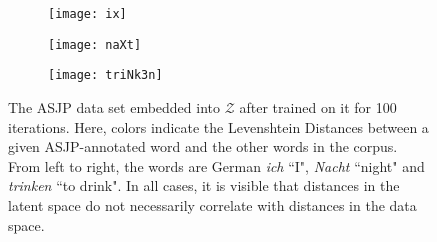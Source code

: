 \documentclass[6pt]{article}
\begin{document}
 \begin{figure}[h!] 
  \begin{subfigure}[b]{0.3\linewidth}
    \centering
    \texttt{[image: ix]} 
    \label{fig:vae_phono_distances0} 
  \end{subfigure}%
  \begin{subfigure}[b]{0.3\linewidth}
    \centering
    \texttt{[image: naXt]} 
    \label{fig:vae_phono_distances1} 
  \end{subfigure} 
  \begin{subfigure}[b]{0.3\linewidth}
    \centering
    \texttt{[image: triNk3n]} 
    \label{fig:vae_phono_distances2} 
  \end{subfigure}%
   \caption{The ASJP data set embedded into $\mathcal{Z}$ after trained on it for 100 iterations. Here, colors indicate the Levenshtein Distances between a given ASJP-annotated word and the other words in the corpus. From left to right, the words are German \textit{ich} ``I", \textit{Nacht} ``night" and \textit{trinken} ``to drink". In all cases, it is visible that distances in the latent space do not necessarily correlate with distances in the data space.}
  \label{fig:vae_phono_distances} 
\end{figure}
%
%
\end{document}
